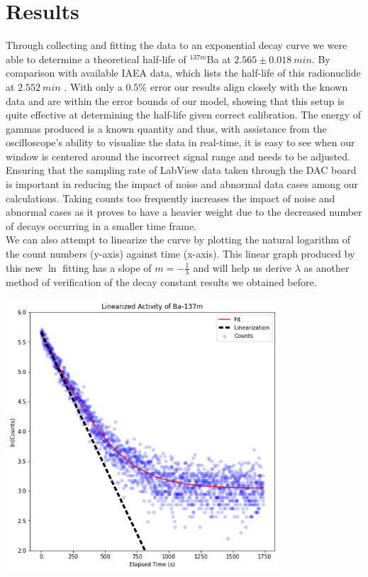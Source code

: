 \documentclass[10pt,letterpaper,onecolumn]{article}
\begin{document}

\section{Results}


Through collecting and fitting the data to an exponential decay curve we were able to determine a theoretical half-life of $^{137m}$Ba at $2.565\pm 0.018\ min$. By comparison with available IAEA data, which lists the half-life of this radionuclide at $2.552\ min$ \cite{IAEA}. With only a $0.5\%$ error our results align closely with the known data and are within the error bounds of our model, showing that this setup is quite effective at determining the half-life given correct calibration. The energy of gammas produced is a known quantity and thus, with assistance from the oscilloscope's ability to visualize the data in real-time, it is easy to see when our window is centered around the incorrect signal range and needs to be adjusted. Ensuring that the sampling rate of LabView data taken through the DAC board is important in reducing the impact of noise and abnormal data cases among our calculations. Taking counts too frequently increases the impact of noise and abnormal cases as it proves to have a heavier weight due to the decreased number of decays occurring in a smaller time frame. \\

We can also attempt to linearize the curve by plotting the natural logarithm of the count numbers (y-axis) against time (x-axis). This linear graph produced by this new $\ln$ fitting has a slope of $m=-\frac{1}{\lambda}$ and will help us derive $\lambda$ as another method of verification of the decay constant results we obtained before.

 \begin{center}
 \includegraphics*[width=4in]{Plot + Fit + Linearization.png}
 \label{fig:linear}
 \end{center}
\end{document}

